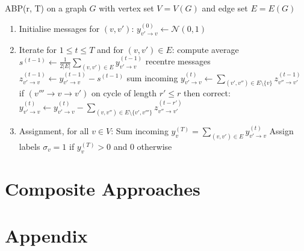 \documentclass[]{article}
\newcommand{\Gaussian}{\mathcal{N}}
\begin{document}
ABP(r, T) on a graph $G$ with vertex set $V = V(G)$ and edge set $E = E(G)$
\begin{enumerate}
	\item Initialise messages for $(v, v')$:
		\subitem $y^{(0)}_{v' \rightarrow v} \leftarrow \Gaussian(0, 1)$
	\item Iterate for $1 \leq t \leq T$ and for $(v, v') \in E$:
		\subitem compute average $s^{(t-1)} \leftarrow \frac{1}{2|E|} \sum_{(v, v') \in E} y^{(t-1)}_{v' \rightarrow v}$
		\subitem recentre messages $z^{(t-1)}_{v' \rightarrow v} \leftarrow y^{(t-1)}_{v' \rightarrow v} - s^{(t-1)}$ 
		\subitem sum incoming $y^{(t)}_{v' \rightarrow v} \leftarrow \sum_{(v', v'') \in E \setminus \{v\}}z^{(t-1)}_{v'' \rightarrow v'}$
		\subitem if $(v''' \rightarrow v \rightarrow v')$ on cycle of length $r' \leq r$ then correct:
			\subsubitem $y^{(t)}_{v' \rightarrow v} \leftarrow y^{(t)}_{v' \rightarrow v} - \sum_{(v, v'') \in E \setminus \{v', v'''\}}z^{(t-r')}_{v'' \rightarrow v'}$
	\item Assignment, for all $v \in V$:
		\subitem Sum incoming $y_v^{(T)} = \sum_{(v, v') \in E} y^{(t)}_{v' \rightarrow v}$
		\subitem Assign labels $\sigma_v = 1$ if $y_v^{(T)} > 0$ and $0$ otherwise
\end{enumerate}

\section{Composite Approaches}

\section{Appendix}
\end{document}
